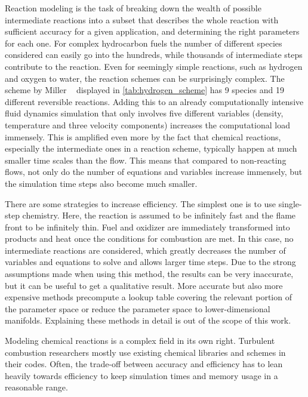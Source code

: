 %
Reaction modeling is the task of breaking down the wealth of possible
intermediate reactions into a subset that describes the whole reaction with
sufficient accuracy for a given application, and determining the right
parameters for each one.
%
For complex hydrocarbon fuels the number of different species considered
can easily go into the hundreds, while thousands of intermediate steps
contribute to the reaction.
%
Even for seemingly simple reactions, such as hydrogen and oxygen to water,
the reaction schemes can be surprisingly complex.
%
The scheme by Miller \etal~\cite{Miller1982} displayed in
\cref{tab:hydrogen_scheme} has 9 species and 19 different reversible reactions.
%
Adding this to an already computationally intensive fluid dynamics simulation
that only involves five different variables (density, temperature and three
velocity components) increases the computational load immensely.
%
This is amplified even more by the fact that chemical reactions, especially the
intermediate ones in a reaction scheme, typically happen at much smaller time
scales than the flow.
%
This means that compared to non-reacting flows, not only do the number of
equations and variables increase immensely, but the simulation time steps also
become much smaller.
%

%
There are some strategies to increase efficiency.
%
The simplest one is to use single-step chemistry.
%
Here, the reaction is assumed to be infinitely fast and the flame front to be
infinitely thin.
%
Fuel and oxidizer are immediately transformed into products and heat once the
conditions for combustion are met.
%
In this case, no intermediate reactions are considered, which greatly decreases
the number of variables and equations to solve and allows larger time steps.
%
Due to the strong assumptions made when using this method, the results can be
very inaccurate, but it can be useful to get a qualitative result.
%
More accurate but also more expensive methods precompute a lookup table covering
the relevant portion of the parameter space or reduce the parameter space to
lower-dimensional manifolds.
%
Explaining these methods in detail is out of the scope of this work.
%

%
Modeling chemical reactions is a complex field in its own right.
%
Turbulent combustion researchers mostly use existing chemical libraries and
schemes in their codes.
%
Often, the trade-off between accuracy and efficiency has to lean heavily towards
efficiency to keep simulation times and memory usage in a reasonable range.
%
%
